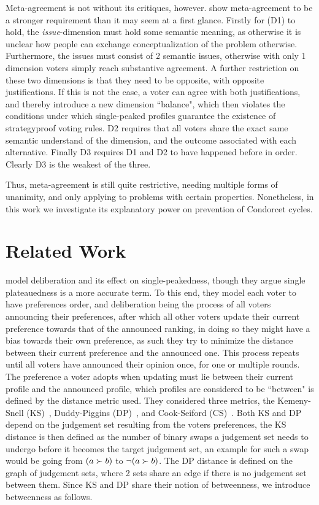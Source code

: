 Meta-agreement is not without its critiques, however. \citet{ottonelliElusiveNotionMetaagreement2013} show meta-agreement to be a stronger requirement than it may seem at a first glance. Firstly for (D1) to hold, the \textit{issue}-dimension must hold some semantic meaning, as otherwise it is unclear how people can exchange conceptualization of the problem otherwise. Furthermore, the issues must consist of 2 semantic issues, otherwise with only 1 dimension voters simply reach substantive agreement. A further restriction on these two dimensions is that they need to be opposite, with opposite justifications. If this is not the case, a voter can agree with both justifications, and thereby introduce a new dimension ``balance", which then violates the conditions under which single-peaked profiles guarantee the existence of strategyproof voting rules. D2 requires that all voters share the exact same semantic understand of the dimension, and the outcome associated with each alternative. Finally D3 requires D1 and D2 to have happened before in order. Clearly D3 is the weakest of the three.

Thus, meta-agreement is still quite restrictive, needing multiple forms of unanimity, and only applying to problems with certain properties. Nonetheless, in this work we investigate its explanatory power on prevention of Condorcet cycles.

\section{Related Work}
\label{section:related_work}
\citet{radDeliberationSinglePeakednessCoherent2021a} model deliberation and its effect on single-peakedness, though they argue single plateauedness is a more accurate term. To this end, they model each voter to have preferences order, and deliberation being the process of all voters announcing their preferences, after which all other voters update their current preference towards that of the announced ranking, in doing so they might have a bias towards their own preference, as such they try to minimize the distance between their current preference and the announced one. This process repeats until all voters have announced their opinion once, for one or multiple rounds. The preference a voter adopts when updating must lie between their current profile and the announced profile, which profiles are considered to be ``between" is defined by the distance metric used. They considered three metrics, the Kemeny-Snell (KS)~\citep{kemeny1962preference}, Duddy-Piggins (DP)~\citep{duddyMeasureDistanceJudgment2012a}, and Cook-Seiford (CS)~\citep{cookPriorityRankingConsensus1978}. Both KS and DP depend on the judgement set resulting from the voters preferences, the KS distance is then defined as the number of binary swaps a judgement set needs to undergo before it becomes the target judgement set, an example for such a swap would be going from $(a \succ b)$ to $\neg (a \succ b)$. The DP distance is defined on the graph of judgement sets, where 2 sets share an edge if there is no judgement set between them. Since KS and DP share their notion of betweenness, we introduce betweenness as follows.

